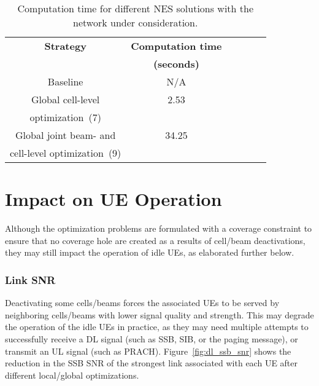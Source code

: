 \begin{table}[]
\begin{center}
\vspace{10pt}
\begin{tabular}{|c|c|c|c|c|c|}
\cline{1-2} 
\textbf{Strategy} &\textbf{Computation time}\\ 
 &\textbf{(seconds)}\\ \cline{1-2} 
Baseline   & N/A  \\ \cline{1-2}  
Global cell-level        & 2.53 \\ 
optimization~(7)          & \\ \cline{1-2}
Global joint beam- and     & 34.25 \\ 
cell-level optimization~(9)       &\\ \cline{1-2}
\end{tabular} 
\vspace{5pt}
\caption{Computation time for different NES solutions with the network under consideration.}
\label{tab:results}
\end{center}
\vspace{-10pt}
\end{table}
\vspace{-5pt}


\section{Impact on UE Operation}
Although the optimization problems are formulated with a coverage constraint to ensure that no coverage hole are created as a results of cell/beam deactivations, they may still impact the operation of idle UEs, as elaborated further below.

\subsubsection{Link SNR}
Deactivating some cells/beams forces the associated UEs to be served by neighboring cells/beams with lower signal quality and strength. This may degrade the operation of the idle UEs in practice, as they may need multiple attempts to successfully receive a DL signal (such as SSB, SIB, or the paging message), or transmit an UL signal (such as PRACH). 
Figure~\ref{fig:dl_ssb_snr} shows the reduction in the SSB SNR of the strongest link associated with each UE after different local/global optimizations. 

